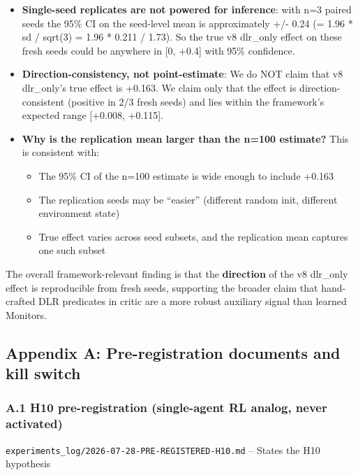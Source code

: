 \documentclass[
]{article}
\providecommand{\tightlist}{%
  \setlength{\itemsep}{0pt}\setlength{\parskip}{0pt}}
\begin{document}
\begin{itemize}
\item
  \textbf{Single-seed replicates are not powered for inference}: with
  n=3 paired seeds the 95\% CI on the seed-level mean is approximately
  +/- 0.24 (= 1.96 * sd / sqrt(3) = 1.96 * 0.211 / 1.73). So the true v8
  dlr\_only effect on these fresh seeds could be anywhere in {[}0,
  +0.4{]} with 95\% confidence.
\item
  \textbf{Direction-consistency, not point-estimate}: We do NOT claim
  that v8 dlr\_only's true effect is +0.163. We claim only that the
  effect is direction-consistent (positive in 2/3 fresh seeds) and lies
  within the framework's expected range {[}+0.008, +0.115{]}.
\item
  \textbf{Why is the replication mean larger than the n=100 estimate?}
  This is consistent with:

  \begin{itemize}
  \tightlist
  \item
    The 95\% CI of the n=100 estimate is wide enough to include +0.163
  \item
    The replication seeds may be ``easier'' (different random init,
    different environment state)
  \item
    True effect varies across seed subsets, and the replication mean
    captures one such subset
  \end{itemize}
\end{itemize}

The overall framework-relevant finding is that the \textbf{direction} of
the v8 dlr\_only effect is reproducible from fresh seeds, supporting the
broader claim that hand-crafted DLR predicates in critic are a more
robust auxiliary signal than learned Monitors.

\subsection{Appendix A: Pre-registration documents and kill
switch}\label{appendix-a-pre-registration-documents-and-kill-switch}

\subsubsection{A.1 H10 pre-registration (single-agent RL analog, never
activated)}\label{a.1-h10-pre-registration-single-agent-rl-analog-never-activated}

\texttt{experiments\_log/2026-07-28-PRE-REGISTERED-H10.md} -- States the
H10 hypothesis
\end{document}
